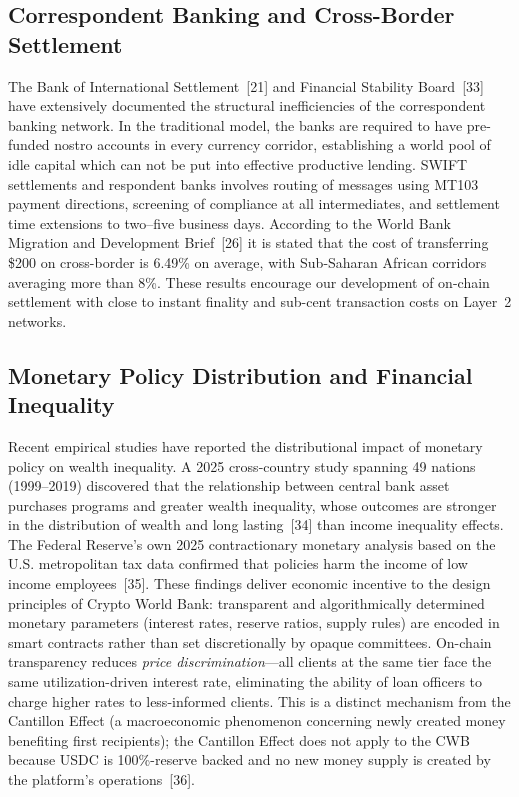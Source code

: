 \documentclass[12pt,a4paper]{report}
\begin{document}
\subsection{Correspondent Banking and Cross-Border Settlement}

The Bank of International Settlement~[21] and Financial Stability Board~[33] have extensively documented the structural inefficiencies of the correspondent banking network. In the traditional model, the banks are required to have pre-funded nostro accounts in every currency corridor, establishing a world pool of idle capital which can not be put into effective productive lending. SWIFT settlements and respondent banks involves routing of messages using MT103 payment directions, screening of compliance at all intermediates, and settlement time extensions to two--five business days. According to the World Bank Migration and Development Brief~[26] it is stated that the cost of transferring \$200 on cross-border is 6.49\% on average, with Sub-Saharan African corridors averaging more than 8\%. These results encourage our development of on-chain settlement with close to instant finality and sub-cent transaction costs on Layer~2 networks.

\subsection{Monetary Policy Distribution and Financial Inequality}

Recent empirical studies have reported the distributional impact of monetary policy on wealth inequality. A 2025 cross-country study spanning 49 nations (1999--2019) discovered that the relationship between central bank asset purchases programs and greater wealth inequality, whose outcomes are stronger in the distribution of wealth and long lasting~[34] than income inequality effects. The Federal Reserve's own 2025 contractionary monetary analysis based on the U.S. metropolitan tax data confirmed that policies harm the income of low income employees~[35]. These findings deliver economic incentive to the design principles of Crypto World Bank: transparent and algorithmically determined monetary parameters (interest rates, reserve ratios, supply rules) are encoded in smart contracts rather than set discretionally by opaque committees. On-chain transparency reduces \textit{price discrimination}---all clients at the same tier face the same utilization-driven interest rate, eliminating the ability of loan officers to charge higher rates to less-informed clients. This is a distinct mechanism from the Cantillon Effect (a macroeconomic phenomenon concerning newly created money benefiting first recipients); the Cantillon Effect does not apply to the CWB because USDC is 100\%-reserve backed and no new money supply is created by the platform's operations~[36].
\end{document}
